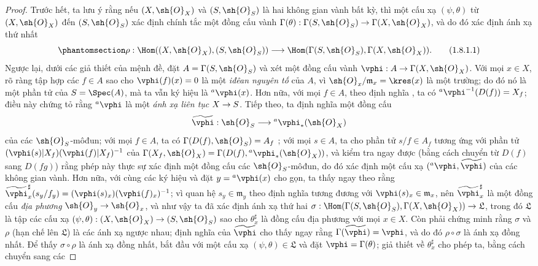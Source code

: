 \documentclass[oneside]{amsart}
\makeatletter
\newcommand{\ega@arrow}[2]{\mathchoice{#1}{#2}{#2}{#2}}
\renewcommand{\to}{\ega@arrow{\longrightarrow}{\rightarrow}}
\let\EGAOriginalLabel\label
\renewcommand{\label}[1]{\phantomsection\EGAOriginalLabel{#1}}
\makeatother
\begin{document}
\begin{proof}
Trước hết, ta lưu ý rằng nếu $(X,\sh{O}_X)$ và $(S,\sh{O}_S)$ là hai
không gian vành bất kỳ, thì một cấu xạ $(\psi,\theta)$ từ
$(X,\sh{O}_X)$ đến $(S,\sh{O}_S)$ xác định chính tắc một đồng cấu vành
$\Gamma(\theta):\Gamma(S,\sh{O}_S)\to\Gamma(X,\sh{O}_X)$, và do đó xác
định ánh xạ thứ nhất
\[
  \label{I.1.8.1.1}
  \rho:\Hom((X,\sh{O}_X),(S,\sh{O}_S))\to\Hom(\Gamma(S,\sh{O}_S),\Gamma(X,\sh{O}_X)).
  \tag{1.8.1.1}
\]
Ngược lại, dưới các giả thiết của mệnh đề, đặt
$A=\Gamma(S,\sh{O}_S)$ và xét một đồng cấu vành
$\vphi:A\to\Gamma(X,\sh{O}_X)$.
Với mọi $x\in X$, rõ ràng tập hợp các $f\in A$ sao cho
$\vphi(f)(x)=0$ là một \emph{iđêan nguyên tố} của $A$, vì
$\sh{O}_x/\mathfrak{m}_x=\kres(x)$ là một trường;
do đó nó là một phần tử của $S=\Spec(A)$, mà ta vẫn ký hiệu là
${}^a\vphi(x)$.
Hơn nữa, với mọi $f\in A$, theo định nghĩa , ta có
${}^a\vphi^{-1}(D(f))=X_f$; điều này chứng tỏ rằng ${}^a\vphi$ là một
\emph{ánh xạ liên tục} $X\to S$.
Tiếp theo, ta định nghĩa một đồng cấu
\[
  \widetilde{\vphi}:\sh{O}_S\to{}^a\vphi_*(\sh{O}_X)
\]
của các $\sh{O}_S$-môđun;
với mọi $f\in A$, ta có $\Gamma(D(f),\sh{O}_S)=A_f$
;
với mọi $s\in A$, ta cho phần tử $s/f\in A_f$ tương ứng với phần tử
$(\vphi(s)|X_f)(\vphi(f)|X_f)^{-1}$ của
$\Gamma(X_f,\sh{O}_X)=\Gamma(D(f),{}^a\vphi_*(\sh{O}_X))$, và kiểm tra
ngay được (bằng cách chuyển từ $D(f)$ sang $D(fg)$) rằng phép này thực
sự xác định một đồng cấu các $\sh{O}_S$-môđun, do đó xác định một cấu xạ
$({}^a\vphi,\widetilde{\vphi})$ của các không gian vành.
Hơn nữa, với cùng các ký hiệu và đặt $y={}^a\vphi(x)$ cho gọn, ta thấy
ngay theo  rằng
$\widetilde{\vphi}_x^\sharp(s_y/f_y)=(\vphi(s)_x)(\vphi(f)_x)^{-1}$;
vì quan hệ $s_y\in\mathfrak{m}_y$ theo định nghĩa tương đương với
$\vphi(s)_x\in\mathfrak{m}_x$, nên $\widetilde{\vphi}_x^\sharp$ là một
đồng cấu \emph{địa phương} $\sh{O}_y\to\sh{O}_x$, và như vậy ta đã xác
định ánh xạ thứ hai
$\sigma:\Hom(\Gamma(S,\sh{O}_S),\Gamma(X,\sh{O}_X))\to\mathfrak{L}$,
trong đó $\mathfrak{L}$ là tập các cấu xạ
$(\psi,\theta):(X,\sh{O}_X)\to(S,\sh{O}_S)$ sao cho
$\theta_x^\sharp$ là đồng cấu địa phương với mọi $x\in X$.
Còn phải chứng minh rằng $\sigma$ và $\rho$ (hạn chế lên
$\mathfrak{L}$) là các ánh xạ ngược nhau;
định nghĩa của $\widetilde{\vphi}$ cho thấy ngay rằng
$\Gamma(\widetilde{\vphi})=\vphi$, và do đó $\rho\circ\sigma$ là ánh xạ
đồng nhất.
Để thấy $\sigma\circ\rho$ là ánh xạ đồng nhất, bắt đầu với một cấu xạ
$(\psi,\theta)\in\mathfrak{L}$ và đặt $\vphi=\Gamma(\theta)$;
giả thiết về $\theta_x^\sharp$ cho phép ta, bằng cách chuyển sang các

\end{proof}
\end{document}
